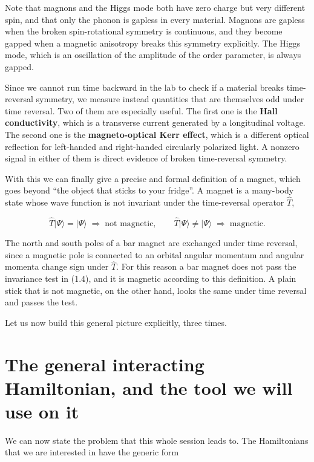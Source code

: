 Note that magnons and the Higgs mode both have zero charge but very different spin, and that only
the phonon is gapless in every material. Magnons are gapless when the broken spin-rotational
symmetry is continuous, and they become gapped when a magnetic anisotropy breaks this symmetry
explicitly. The Higgs mode, which is an oscillation of the amplitude of the order parameter, is
always gapped.

Since we cannot run time backward in the lab to check if a material breaks time-reversal symmetry,
we measure instead quantities that are themselves odd under time reversal. Two of them are
especially useful. The first one is the \textbf{Hall conductivity}, which is a transverse current
generated by a longitudinal voltage. The second one is the \textbf{magneto-optical Kerr effect},
which is a different optical reflection for left-handed and right-handed circularly polarized light.
A nonzero signal in either of them is direct evidence of broken time-reversal symmetry.

With this we can finally give a precise and formal definition of a magnet, which goes beyond ``the
object that sticks to your fridge''. A magnet is a many-body state whose wave function is not
invariant under the time-reversal operator $\hat T$,

\begin{equation}
\hat T|\Psi\rangle = |\Psi\rangle \;\Rightarrow\; \text{not magnetic}, \qquad
\hat T|\Psi\rangle \neq |\Psi\rangle \;\Rightarrow\; \text{magnetic}.
\end{equation}

The north and south poles of a bar magnet are exchanged under time reversal, since a magnetic pole
is connected to an orbital angular momentum and angular momenta change sign under $\hat T$. For this
reason a bar magnet does not pass the invariance test in (1.4), and it is magnetic according to this
definition. A plain stick that is not magnetic, on the other hand, looks the same under time
reversal and passes the test.

Let us now build this general picture explicitly, three times.

\section{The general interacting Hamiltonian, and the tool we will use on it}

We can now state the problem that this whole session leads to. The Hamiltonians that we are
interested in have the generic form

